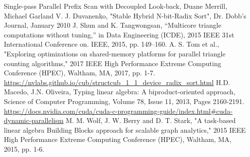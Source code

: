\documentclass[conference]{IEEEtran}
\begin{document}
\begin{thebibliography}{00}
 Single-pass Parallel Prefix Scan with Decoupled Look-back, Duane Merrill, Michael Garland
 V. J. Duvanenko, "Stable Hybrid N-bit-Radix Sort", Dr. Dobb's Journal, January 2010
 J. Shun and K. Tangwongsan, “Multicore triangle computations without tuning,” in Data Engineering (ICDE), 2015 IEEE 31st International Conference on. IEEE, 2015, pp. 149–160.
 A. S. Tom et al., "Exploring optimizations on shared-memory platforms for parallel triangle counting algorithms," 2017 IEEE High Performance Extreme Computing Conference (HPEC), Waltham, MA, 2017, pp. 1-7.
 \url{https://nvlabs.github.io/cub/structcub_1_1_device_radix_sort.html}
 H.D. Macedo, J.N. Oliveira, Typing linear algebra: A biproduct-oriented approach, Science of Computer Programming, Volume 78, Issue 11, 2013, Pages 2160-2191.
 \url{https://docs.nvidia.com/cuda/cuda-c-programming-guide/index.html#cuda-dynamic-parallelism}
 M. M. Wolf, J. W. Berry and D. T. Stark, "A task-based linear algebra Building Blocks approach for scalable graph analytics," 2015 IEEE High Performance Extreme Computing Conference (HPEC), Waltham, MA, 2015, pp. 1-6.
\end{thebibliography}
\end{document}
